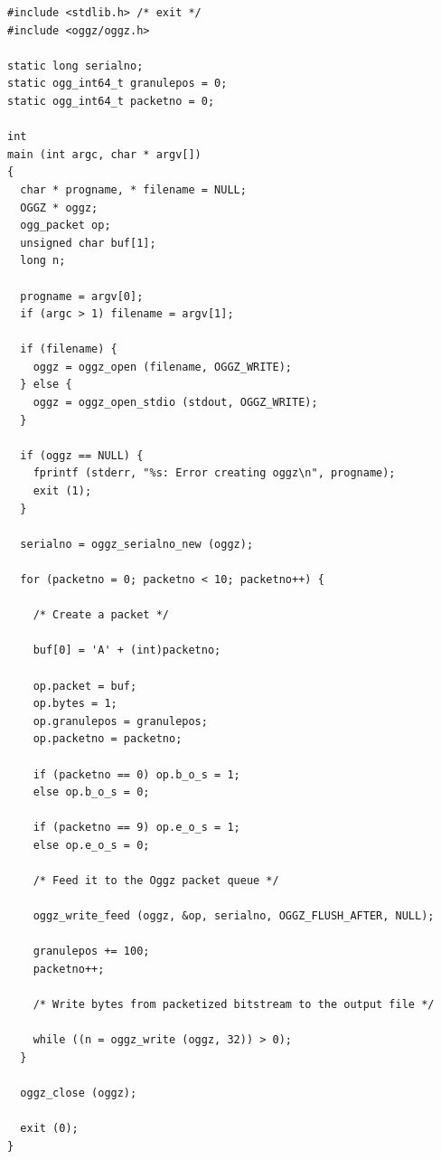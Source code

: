 \footnotesize\begin{verbatim}
#include <stdlib.h> /* exit */
#include <oggz/oggz.h>

static long serialno;
static ogg_int64_t granulepos = 0;
static ogg_int64_t packetno = 0;

int
main (int argc, char * argv[])
{
  char * progname, * filename = NULL;
  OGGZ * oggz;
  ogg_packet op;
  unsigned char buf[1];
  long n;

  progname = argv[0];
  if (argc > 1) filename = argv[1];

  if (filename) {
    oggz = oggz_open (filename, OGGZ_WRITE);
  } else {
    oggz = oggz_open_stdio (stdout, OGGZ_WRITE);
  }

  if (oggz == NULL) {
    fprintf (stderr, "%s: Error creating oggz\n", progname);
    exit (1);
  }

  serialno = oggz_serialno_new (oggz);

  for (packetno = 0; packetno < 10; packetno++) {

    /* Create a packet */

    buf[0] = 'A' + (int)packetno;

    op.packet = buf;
    op.bytes = 1;
    op.granulepos = granulepos;
    op.packetno = packetno;
    
    if (packetno == 0) op.b_o_s = 1;
    else op.b_o_s = 0;
    
    if (packetno == 9) op.e_o_s = 1;
    else op.e_o_s = 0;
    
    /* Feed it to the Oggz packet queue */

    oggz_write_feed (oggz, &op, serialno, OGGZ_FLUSH_AFTER, NULL);
    
    granulepos += 100;
    packetno++;

    /* Write bytes from packetized bitstream to the output file */

    while ((n = oggz_write (oggz, 32)) > 0);
  }

  oggz_close (oggz);

  exit (0);
}
\end{verbatim}\normalsize
 

